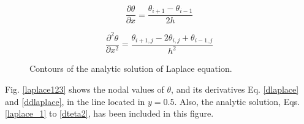 \begin{equation}
    \frac{\partial \theta}{\partial x}=\frac{\theta_{i+1}-\theta_{i-1}}{2h}
    \label{dlaplace}
\end{equation}

\begin{equation}
    \frac{\partial^2 \theta}{\partial x^2}=\frac{\theta_{i+1,j}-2\theta_{i,j}+\theta_{i-1,j}}{h^2}
    \label{ddlaplace}
\end{equation}

\begin{comment}
 

 \begin{figure}[t!]
 \centering
 \subfigure[$h_0$=0.25]
             {\label{lap7}
             \includegraphics[ angle=0, scale=0.85]
             {./laplace_fig/figure7bn.pdf}}
 \subfigure[$h_1$=0.125]
             {\label{lap8}
             \includegraphics[ angle=0, scale=0.85]
             {./laplace_fig/figure8bn.pdf}}
 \subfigure[$h_2$=0.0625]
             {\label{lap9}
             \includegraphics[ angle=0, scale=0.85]
             {./laplace_fig/figure9bn.pdf}}
  \caption{Contours of $\theta$ obtained by discretization of the Laplace equation, using  the \textit{Liebmann's method}, Eq. \ref{dis_laplace}, in meshes with different element sizes, $h$.}
\label{laplace789} 
\end{figure}
\end{comment}

 \begin{figure}[t!]
 \centering
  \caption{Contours of the analytic solution of Laplace equation.}
\label{laplace_an} 
\end{figure}


Fig. \ref{laplace123} shows the nodal values of $\theta$, and its derivatives  Eq. \ref{dlaplace} and \ref{ddlaplace}, in the line located in $y=0.5$. Also, the analytic solution, Eqs. \ref{laplace_1} to \ref{dteta2}, has been included in this figure. 


